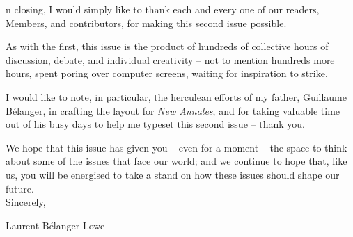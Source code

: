 \label{ch:letter-from-the-president}

n closing, I would simply like to thank each and every one of our readers, Members, and contributors, for making this second issue possible. 

As with the first, this issue is the product of hundreds of collective hours of discussion, debate, and individual creativity -- not to mention hundreds more hours, spent poring over computer screens, waiting for inspiration to strike. 

I would like to note, in particular, the herculean efforts of my father, Guillaume B\'elanger, in crafting the layout for \textit{New Annales}, and for taking valuable time out of his busy days to help me typeset this second issue -- thank you. 

We hope that this issue has given you -- even for a moment -- the space to think about some of the issues that face our world; and we continue to hope that, like us, you will be energised to take a stand on how these issues should shape our future. \\

Sincerely,

Laurent B\'elanger-Lowe